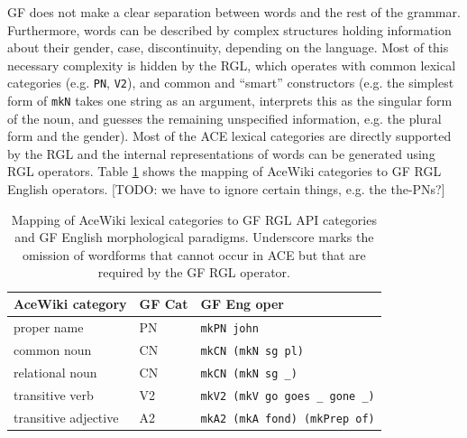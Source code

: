 \documentclass[a4paper]{article}
\def\xp#1{\texttt{#1}}
\begin{document}
GF does not make a clear separation between words and the rest of the grammar.
Furthermore, words can be described by complex structures holding information
about their gender, case, discontinuity, depending on the language. Most of
this necessary complexity is hidden by the RGL, which operates with common
lexical categories (e.g. \texttt{PN}, \texttt{V2}), and common and ``smart''
constructors (e.g. the simplest form of \texttt{mkN} takes one string as an
argument,
interprets this as the singular form of the noun, and guesses the remaining
unspecified information, e.g. the plural form and the gender).
Most of the ACE lexical categories are directly supported by the RGL and the
internal representations of words can be generated using RGL operators.
Table \ref{mapping_acewiki_to_gf} shows the mapping of AceWiki categories
to GF RGL English operators.
[TODO: we have to ignore certain things, e.g.  the the-PNs?]

\begin{table}
\begin{center}
\caption{Mapping of AceWiki lexical categories
to GF RGL API categories and GF English
morphological paradigms. Underscore marks the omission of wordforms that
cannot occur in ACE but that are required by the GF RGL
operator.\protect\label{mapping_acewiki_to_gf}}
\begin{tabular}{ l l l }
\hline
AceWiki category & GF Cat & GF Eng oper \\
\hline
proper name & PN & \xp{mkPN john} \\
common noun & CN & \xp{mkCN (mkN sg pl)} \\
relational noun & CN & \xp{mkCN (mkN sg \_)} \\
transitive verb & V2 & \xp{mkV2 (mkV go goes \_ gone \_)} \\
transitive adjective & A2 & \xp{mkA2 (mkA fond) (mkPrep of)} \\
\hline
\end{tabular}
\end{center}
\end{table}

%
%
\end{document}
